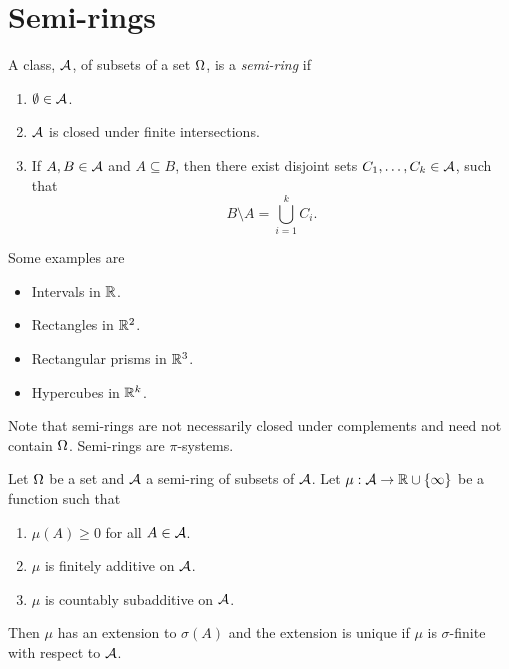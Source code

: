 \section{Semi-rings}
\begin{defn}
    A class, ${\mathcal{A}}$, of subsets of a set ${{\Omega}}$, is a \emph{semi-ring} if
    \begin{enumerate}
        \item $\emptyset \in {\mathcal{A}}$.
        \item ${\mathcal{A}}$ is closed under finite intersections.
        \item If $A,B \in {\mathcal{A}}$ and $A \subseteq B$, then there exist disjoint sets $C_1,\ldots,C_k \in {\mathcal{A}}$, such that \[ B\setminus A = \bigcup_{i=1}^k C_i.\]
    \end{enumerate}
\end{defn}
Some examples are
\begin{itemize}
    \item Intervals in ${\mathbb R}$.
    \item Rectangles in ${\mathbb R}^2$.
    \item Rectangular prisms in ${\mathbb R}^3$.
    \item Hypercubes in ${\mathbb R}^k$.
\end{itemize}
Note that semi-rings are not necessarily closed under complements and need not contain ${{\Omega}}$. Semi-rings are $\pi$-systems.
\begin{thrm}
    Let ${{\Omega}}$ be a set and ${\mathcal{A}}$ a semi-ring of subsets of ${\mathcal{A}}$. Let $\mu : {\mathcal{A}} \to {\mathbb R} \cup \{\infty\}$ be a function such that 
    \begin{enumerate}
        \item $\mu(A) \ge 0$ for all $A \in {\mathcal{A}}$.
        \item $\mu$ is finitely additive on ${\mathcal{A}}$.
        \item $\mu$ is countably subadditive on ${\mathcal{A}}$.
    \end{enumerate}
    Then $\mu$ has an extension to $\sigma(A)$ and the extension is unique if $\mu$ is $\sigma$-finite with respect to ${\mathcal{A}}$.
\end{thrm}
